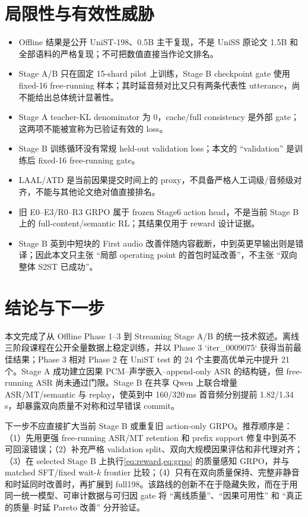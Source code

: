 \documentclass[11pt,a4paper]{article}
\begin{document}
\section{局限性与有效性威胁}

\begin{itemize}
  \item Offline 结果是公开 UniST-198、0.5B 主干复现，不是 UniSS 原论文 1.5B 和全部语料的严格复现；不可把数值直接当作论文排名。
  \item Stage A/B 只在固定 15-shard pilot 上训练，Stage B checkpoint gate 使用 fixed-16 free-running 样本；其时延音频对比又只有两条代表性 utterance，尚不能给出总体统计显著性。
  \item Stage A teacher-KL denominator 为 0，cache/full consistency 是外部 gate；这两项不能被宣称为已验证有效的 loss。
  \item Stage B 训练循环没有常规 held-out validation loss；本文的 ``validation'' 是训练后 fixed-16 free-running gate。
  \item LAAL/ATD 是当前因果提交时间上的 proxy，不具备严格人工词级/音频级对齐，不能与其他论文绝对值直接排名。
  \item 旧 E0--E3/R0--R3 GRPO 属于 frozen Stage6 action head，不是当前 Stage B 上的 full-content/semantic RL；其结果仅用于 reward 设计证据。
  \item Stage B 英到中短块的 First audio 改善伴随内容截断，中到英更早输出则是错译；因此本文只主张 ``局部 operating point 的首包时延改善''，不主张 ``双向整体 S2ST 已成功''。
\end{itemize}

\section{结论与下一步}

本文完成了从 Offline Phase 1--3 到 Streaming Stage A/B 的统一技术叙述。离线三阶段课程在公开全量数据上稳定训练，并以 Phase 3 `iter\_0009075` 获得当前最佳结果；Phase 3 相对 Phase 2 在 UniST test 的 24 个主要高优单元中提升 21 个。Stage A 成功建立因果 PCM--声学嵌入--append-only ASR 的结构链，但 free-running ASR 尚未通过门限。Stage B 在共享 Qwen 上联合增量 ASR/MT/semantic 与 replay，使英到中 160/320\,ms 首音频分别提前 1.82/1.34\,s，却暴露双向质量不对称和过早错误 commit。

下一步不应直接扩大当前 Stage B 或重复旧 action-only GRPO。推荐顺序是：（1）先用更强 free-running ASR/MT retention 和 prefix support 修复中到英不可回滚错误；（2）补充严格 validation split、双向大规模因果评估和非代理对齐；（3）在 selected Stage B 上执行\cref{eq:reward,eq:grpo} 的质量感知 GRPO，并与 matched SFT/fixed wait-$k$ frontier 比较；（4）只有在双向质量保持、完整非静音和时延同时改善时，再扩展到 full198。该路线的创新不在于隐藏失败，而在于用同一统一模型、可审计数据与可归因 gate 将 ``离线质量''、``因果可用性'' 和 ``真正的质量--时延 Pareto 改善'' 分开验证。
\end{document}
